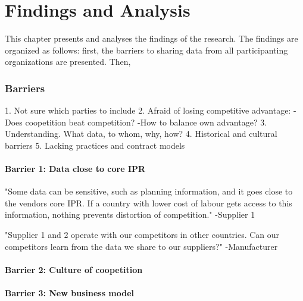 \chapter{Findings and Analysis}

This chapter presents and analyses the findings of the research. The findings are organized as follows: first, the barriers to sharing data from all participanting organizations are presented. Then, 


\label{chapter:results}




\subsection{Barriers}
1. Not sure which parties to include
2. Afraid of losing competitive advantage:
	-Does coopetition beat competition?
	-How to balance own advantage?
3. Understanding. What data, to whom, why, how?
4. Historical and cultural barriers
5. Lacking practices and contract models

\subsubsection{Barrier 1: Data close to core IPR}

"Some data can be sensitive, such as planning information, and it goes close to the vendors core IPR. If a country with lower cost of labour gets access to this information, nothing prevents distortion of competition."
-Supplier 1


"Supplier 1 and 2 operate with our competitors in other countries. Can our competitors learn from the data we share to our suppliers?"
-Manufacturer


\subsubsection{Barrier 2: Culture of coopetition}


\subsubsection{Barrier 3: New business model}

